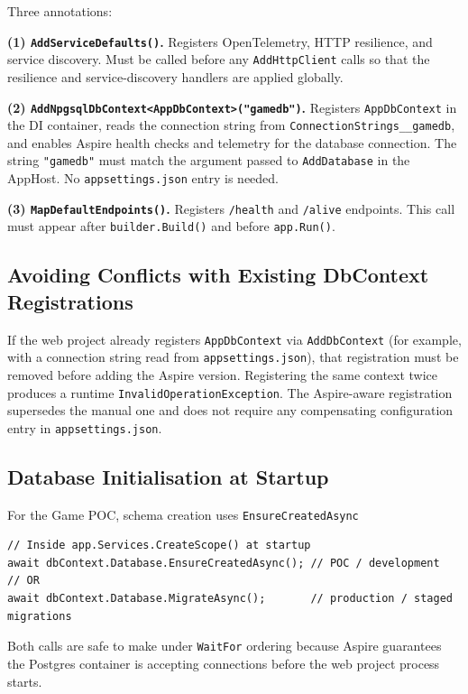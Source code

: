 Three annotations:

\textbf{(1) \texttt{AddServiceDefaults()}.} Registers OpenTelemetry, HTTP resilience, and service discovery. Must be called before any \texttt{AddHttpClient} calls so that the resilience and service-discovery handlers are applied globally.

\textbf{(2) \texttt{AddNpgsqlDbContext\textless AppDbContext\textgreater("gamedb")}.} Registers \texttt{AppDbContext} in the DI container, reads the connection string from \texttt{ConnectionStrings\_\_gamedb}, and enables Aspire health checks and telemetry for the database connection. The string \texttt{"gamedb"} must match the argument passed to \texttt{AddDatabase} in the AppHost. No \texttt{appsettings.json} entry is needed.

\textbf{(3) \texttt{MapDefaultEndpoints()}.} Registers \texttt{/health} and \texttt{/alive} endpoints. This call must appear after \texttt{builder.Build()} and before \texttt{app.Run()}.

\subsection{Avoiding Conflicts with Existing DbContext Registrations}

If the web project already registers \texttt{AppDbContext} via \texttt{AddDbContext} (for example, with a connection string read from \texttt{appsettings.json}), that registration must be removed before adding the Aspire version. Registering the same context twice produces a runtime \texttt{InvalidOperationException}. The Aspire-aware registration supersedes the manual one and does not require any compensating configuration entry in \texttt{appsettings.json}.

\subsection{Database Initialisation at Startup}

For the Game POC, schema creation uses \texttt{EnsureCreatedAsync}

\begin{lstlisting}[language={[Sharp]C}]
// Inside app.Services.CreateScope() at startup
await dbContext.Database.EnsureCreatedAsync(); // POC / development
// OR
await dbContext.Database.MigrateAsync();       // production / staged migrations
\end{lstlisting}

Both calls are safe to make under \texttt{WaitFor} ordering because Aspire guarantees the Postgres container is accepting connections before the web project process starts.
